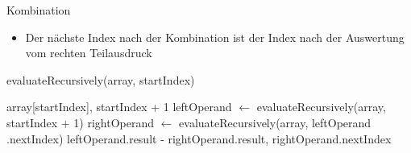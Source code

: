 \documentclass{../tuda-beamer}
\begin{document}
    \begin{frame}{Kombination}
        \begin{itemize}
            \item Der nächste Index nach der Kombination ist der Index nach der Auswertung vom
            rechten Teilausdruck
        \end{itemize}

        \begin{algorithm}[H]
            \caption{evaluateRecursively(array, startIndex)}
            \begin{algorithmic}[1]
                    \State \Return array[startIndex], startIndex + 1
                \Else
                    \State leftOperand \(\leftarrow\) evaluateRecursively(array, startIndex + 1)
                    \State rightOperand \(\leftarrow\) evaluateRecursively(array, leftOperand
                    .nextIndex)
                    \State \Return leftOperand.result - rightOperand.result, rightOperand.nextIndex
                \EndIf
            \end{algorithmic}
        \end{algorithm}
    \end{frame}

    \begin{frame}[c]
        
    \end{frame}
\end{document}
